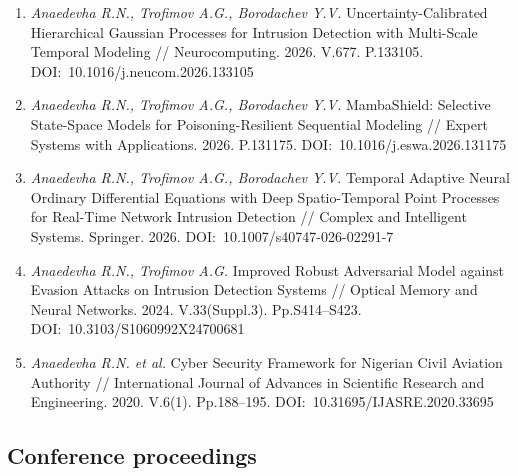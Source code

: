 \documentclass[12pt,a5paper]{article}
\begin{document}
\begin{enumerate}
\item \textit{Anaedevha R.N., Trofimov A.G., Borodachev Y.V.} Uncertainty-Calibrated Hierarchical Gaussian Processes for Intrusion Detection with Multi-Scale Temporal Modeling // Neurocomputing. 2026. V.677. P.133105. DOI:~10.1016/j.neucom.2026.133105

\item \textit{Anaedevha R.N., Trofimov A.G., Borodachev Y.V.} MambaShield: Selective State-Space Models for Poisoning-Resilient Sequential Modeling // Expert Systems with Applications. 2026. P.131175. DOI:~10.1016/j.eswa.2026.131175

\item \textit{Anaedevha R.N., Trofimov A.G., Borodachev Y.V.} Temporal Adaptive Neural Ordinary Differential Equations with Deep Spatio-Temporal Point Processes for Real-Time Network Intrusion Detection // Complex and Intelligent Systems. Springer. 2026. DOI:~10.1007/s40747-026-02291-7

\item \textit{Anaedevha R.N., Trofimov A.G.} Improved Robust Adversarial Model against Evasion Attacks on Intrusion Detection Systems // Optical Memory and Neural Networks. 2024. V.33(Suppl.3). Pp.S414--S423. DOI:~10.3103/S1060992X24700681

\item \textit{Anaedevha R.N. et al.} Cyber Security Framework for Nigerian Civil Aviation Authority // International Journal of Advances in Scientific Research and Engineering. 2020. V.6(1). Pp.188--195. DOI:~10.31695/IJASRE.2020.33695
\end{enumerate}

\subsection*{Conference proceedings}
\end{document}
